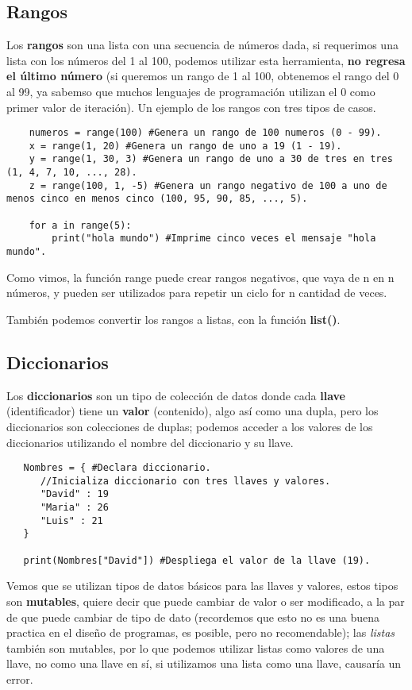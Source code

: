 \subsection{Rangos}
\hspace{0.55cm}Los \textbf{rangos} son una lista con una secuencia de números dada, si requerimos una lista con los números del 1 al 100, podemos utilizar esta herramienta, \textbf{no regresa el último número} (si queremos un rango de 1 al 100, obtenemos el rango del 0 al 99, ya sabemso que muchos lenguajes de programación utilizan el 0 como primer valor de iteración). Un ejemplo de los rangos con tres tipos de casos.
\begin{lstlisting}
	numeros = range(100) #Genera un rango de 100 numeros (0 - 99).
	x = range(1, 20) #Genera un rango de uno a 19 (1 - 19).
	y = range(1, 30, 3) #Genera un rango de uno a 30 de tres en tres (1, 4, 7, 10, ..., 28).
	z = range(100, 1, -5) #Genera un rango negativo de 100 a uno de menos cinco en menos cinco (100, 95, 90, 85, ..., 5).
	
	for a in range(5):
		print("hola mundo") #Imprime cinco veces el mensaje "hola mundo".
\end{lstlisting}

Como vimos, la función range puede crear rangos negativos, que vaya de n en n números, y pueden ser utilizados para repetir un ciclo for n cantidad de veces.

También podemos convertir los rangos a listas, con la función \textbf{list()}.


\subsection{Diccionarios}
\hspace{0.55cm}Los \textbf{diccionarios} son un tipo de colección de datos donde cada \textbf{llave} (identificador) tiene un \textbf{valor} (contenido), algo así como una dupla, pero los diccionarios son colecciones de duplas; podemos acceder a los valores de los diccionarios utilizando el nombre del diccionario y su llave.
\begin{lstlisting}
   Nombres = { #Declara diccionario.
      //Inicializa diccionario con tres llaves y valores.
      "David" : 19
      "Maria" : 26
      "Luis" : 21
   }
   
   print(Nombres["David"]) #Despliega el valor de la llave (19).
\end{lstlisting}

Vemos que se utilizan tipos de datos básicos para las llaves y valores, estos tipos son \textbf{mutables}, quiere decir que puede cambiar de valor o ser modificado, a la par de que puede cambiar de tipo de dato (recordemos que esto no es una buena practica en el diseño de programas, es posible, pero no recomendable); las \textit{listas} también son mutables, por lo que podemos utilizar listas como valores de una llave, no como una llave en sí, si utilizamos una lista como una llave, causaría un error.


